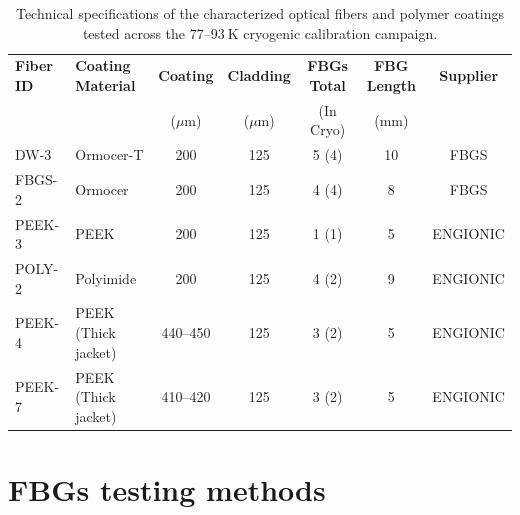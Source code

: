 \documentclass[preprint,11pt]{elsarticle}
\begin{document}
\begin{table}[htpb]
    \centering
    \scriptsize
    \setlength{\tabcolsep}{4pt}
    \caption{Technical specifications of the characterized optical fibers and polymer coatings tested across the $77$--$93~\text{K}$ cryogenic calibration campaign.}
    \label{tab:fiber_specs}
    \begin{tabular}{llccccc}
        \toprule
        \textbf{Fiber ID} & \textbf{Coating Material} & \textbf{Coating} & \textbf{Cladding} & \textbf{FBGs Total} & \textbf{FBG Length} & \textbf{Supplier} \\
                          &                            & ($\mu\text{m}$)  & ($\mu\text{m}$)   & (In Cryo)           & (mm)                &                   \\
        \midrule
        DW-3              & Ormocer-T                  & 200              & 125               & 5 (4)               & 10                  & FBGS              \\
        FBGS-2            & Ormocer                    & 200              & 125               & 4 (4)               & 8                   & FBGS              \\
        PEEK-3            & PEEK                       & 200              & 125               & 1 (1)               & 5                   & ENGIONIC          \\
        POLY-2            & Polyimide                  & 200              & 125               & 4 (2)               & 9                   & ENGIONIC          \\
        PEEK-4            & PEEK (Thick jacket)        & 440--450         & 125               & 3 (2)               & 5                   & ENGIONIC          \\
        PEEK-7            & PEEK (Thick jacket)        & 410--420         & 125               & 3 (2)               & 5                   & ENGIONIC          \\
        \bottomrule
    \end{tabular}
\end{table}



\section{FBGs testing methods}
\label{sec:setup}
\end{document}
